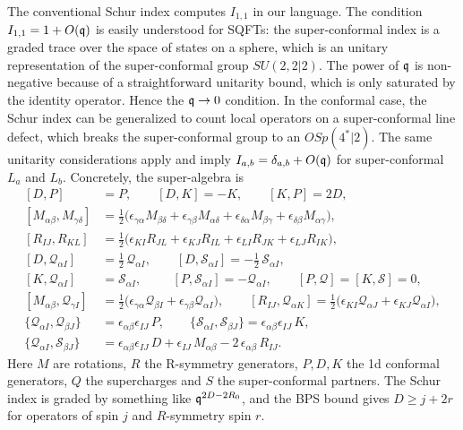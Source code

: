 \documentclass[12pt]{amsart}
\begin{document}
The conventional Schur index computes $I_{1,1}$ in our language. The condition $I_{1,1} = 1 + O(\mathfrak{q})$ is easily understood for SQFTs: the super-conformal index is a graded trace over 
the space of states on a sphere, which is an unitary representation of the super-conformal group $SU(2,2|2)$. The power of $\mathfrak{q}$ is non-negative because of a straightforward unitarity bound,
which is only saturated by the identity operator. Hence the $\mathfrak{q}\to 0$ condition. In the conformal case, the Schur index can be generalized to count local operators 
on a super-conformal line defect, which breaks the super-conformal group to an $OSp(4^*|2)$. The same unitarity considerations apply and imply $I_{a,b} = \delta_{a,b}+ O(\mathfrak{q})$
for super-conformal $L_a$ and $L_b$. Concretely, the super-algebra is
\begin{align}
[D,P] &= P, \qquad [D,K] = -K, \qquad [K,P] = 2D, \\[2pt]
[M_{\alpha\beta},M_{\gamma\delta}] &= \tfrac12\big(
  \epsilon_{\gamma\alpha}M_{\beta\delta}+\epsilon_{\gamma\beta}M_{\alpha\delta}
 +\epsilon_{\delta\alpha}M_{\beta\gamma}+\epsilon_{\delta\beta}M_{\alpha\gamma}\big), \\[2pt]
[R_{IJ},R_{KL}] &= \tfrac12\big(
  \epsilon_{KI}R_{JL}+\epsilon_{KJ}R_{IL}
 +\epsilon_{LI}R_{JK}+\epsilon_{LJ}R_{IK}\big), \\[4pt]
[D,\mathcal{Q}_{\alpha I}] &= \tfrac12\,\mathcal{Q}_{\alpha I}, \qquad
[D,\mathcal{S}_{\alpha I}] = -\tfrac12\,\mathcal{S}_{\alpha I}, \\[2pt]
[K,\mathcal{Q}_{\alpha I}] &= \mathcal{S}_{\alpha I}, \qquad\ \
[P,\mathcal{S}_{\alpha I}] = -\mathcal{Q}_{\alpha I}, \qquad
[P,\mathcal{Q}] = [K,\mathcal{S}] = 0, \\[2pt]
[M_{\alpha\beta},\mathcal{Q}_{\gamma I}] &= \tfrac12\big(
  \epsilon_{\gamma\alpha}\mathcal{Q}_{\beta I}+\epsilon_{\gamma\beta}\mathcal{Q}_{\alpha I}\big),
\qquad
[R_{IJ},\mathcal{Q}_{\alpha K}] = \tfrac12\big(
  \epsilon_{KI}\mathcal{Q}_{\alpha J}+\epsilon_{KJ}\mathcal{Q}_{\alpha I}\big), \\[4pt]
\{\mathcal{Q}_{\alpha I},\mathcal{Q}_{\beta J}\} &= \epsilon_{\alpha\beta}\epsilon_{IJ}\,P,
\qquad
\{\mathcal{S}_{\alpha I},\mathcal{S}_{\beta J}\} = \epsilon_{\alpha\beta}\epsilon_{IJ}\,K, \\[2pt]
\{\mathcal{Q}_{\alpha I},\mathcal{S}_{\beta J}\} &=
  \epsilon_{\alpha\beta}\epsilon_{IJ}\,D
+ \epsilon_{IJ}\,M_{\alpha\beta}
- 2\,\epsilon_{\alpha\beta}\,R_{IJ}.
\end{align}
Here $M$ are rotations, $R$ the R-symmetry generators, $P,D,K$ the 1d conformal generators, $Q$ the supercharges and $S$ the super-conformal partners. The Schur index is 
graded by something like $\mathfrak{q}^{2D - 2R_0}$, and the BPS bound gives $D \geq j + 2 r$ for operators of spin $j$ and $R$-symmetry spin $r$. 
\end{document}
